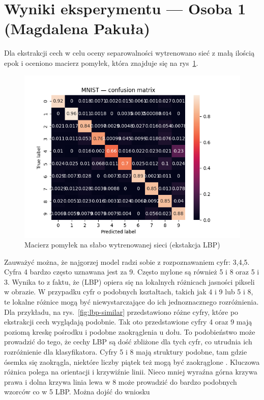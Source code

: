 \documentclass[10pt]{article}
\begin{document}
\pagebreak

\section{Wyniki eksperymentu --- Osoba 1 (Magdalena Pakuła)}
Dla ekstrakcji cech w celu oceny separowalności wytrenowano sieć z małą ilością epok i oceniono macierz pomyłek, która znajduje się na rys~\ref{fig:lbp-bad-cm}.

\begin{figure}[H]\centering
    \includegraphics[width=.3\linewidth]{img/LBP/LBP_MLP}
    \caption{Macierz pomyłek na słabo wytrenowanej sieci (ekstakcja LBP)}\label{fig:lbp-bad-cm}
\end{figure}

Zauważyć można, że najgorzej model radzi sobie z rozpoznawaniem cyfr: 3,4,5.
Cyfra 4 bardzo często uznawana jest za 9.
Często mylone są również 5 i 8 oraz 5 i 3.
Wynika to z faktu, że (LBP) opiera się na lokalnych różnicach jasności pikseli w obrazie. W przypadku cyfr o podobnych kształtach, takich jak 4 i 9 lub 5 i 8, te lokalne różnice mogą być niewystarczające do ich jednoznacznego rozróżnienia.
Dla przykładu, na rys.~\ref{fig:lbp-similar} przedstawiono różne cyfry, które po
ekstrakcji cech wyglądają podobnie.
Tak oto przedstawione cyfry 4 oraz 9 mają poziomą kreskę pośrodku i podobne zaokrąglenia u dołu.
To podobieństwo może prowadzić do tego, że cechy LBP są dość zbliżone dla tych cyfr, co utrudnia ich rozróżnienie dla klasyfikatora.
Cyfry 5 i 8 mają struktury podobne, tam gdzie ósemka się zaokrągla, niektóre liczby piątek też mogą być zaokrąglone . Kluczowa różnica polega na orientacji i krzywiźnie linii.
Nieco mniej wyraźna górna krzywa prawa i dolna krzywa linia lewa w 8 może prowadzić do bardzo podobnych wzorców co w 5 LBP. Można dojść do wniosku
\end{document}
